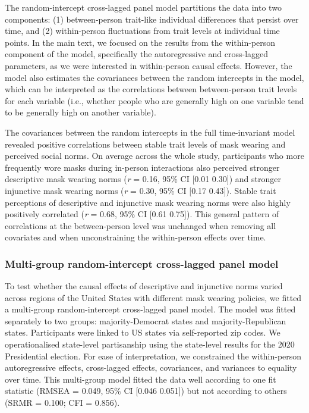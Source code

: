 \documentclass[
  man, donotrepeattitle,floatsintext]{apa6}
\begin{document}
The random-intercept cross-lagged panel model partitions the data into two components: (1) between-person trait-like individual differences that persist over time, and (2) within-person fluctuations from trait levels at individual time points. In the main text, we focused on the results from the within-person component of the model, specifically the autoregressive and cross-lagged parameters, as we were interested in within-person causal effects. However, the model also estimates the covariances between the random intercepts in the model, which can be interpreted as the correlations between between-person trait levels for each variable (i.e., whether people who are generally high on one variable tend to be generally high on another variable).

The covariances between the random intercepts in the full time-invariant model revealed positive correlations between stable trait levels of mask wearing and perceived social norms. On average across the whole study, participants who more frequently wore masks during in-person interactions also perceived stronger descriptive mask wearing norms (\emph{r} = 0.16, 95\% CI {[}0.01 0.30{]}) and stronger injunctive mask wearing norms (\emph{r} = 0.30, 95\% CI {[}0.17 0.43{]}). Stable trait perceptions of descriptive and injunctive mask wearing norms were also highly positively correlated (\emph{r} = 0.68, 95\% CI {[}0.61 0.75{]}). This general pattern of correlations at the between-person level was unchanged when removing all covariates and when unconstraining the within-person effects over time.

\hypertarget{multi-group-random-intercept-cross-lagged-panel-model}{%
\subsubsection{Multi-group random-intercept cross-lagged panel model}\label{multi-group-random-intercept-cross-lagged-panel-model}}

To test whether the causal effects of descriptive and injunctive norms varied across regions of the United States with different mask wearing policies, we fitted a multi-group random-intercept cross-lagged panel model. The model was fitted separately to two groups: majority-Democrat states and majority-Republican states. Participants were linked to US states via self-reported zip codes. We operationalised state-level partisanship using the state-level results for the 2020 Presidential election. For ease of interpretation, we constrained the within-person autoregressive effects, cross-lagged effects, covariances, and variances to equality over time. This multi-group model fitted the data well according to one fit statistic (RMSEA = 0.049, 95\% CI {[}0.046 0.051{]}) but not according to others (SRMR = 0.100; CFI = 0.856).
\end{document}
